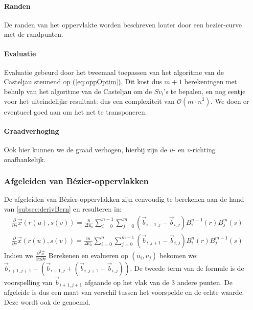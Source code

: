\documentclass[a4paper,titlepage]{article}
\newcommand{\termen}[1]{\index{#1}\textbf{\sffamily{#1}}}
\newcommand{\brak}[1]{\left(#1\right)}
\newcommand{\bigoh}[1]{\ensuremath{\mathcal{O}\left(#1\right)}}
\begin{document}
\paragraph{Randen}
De randen van het oppervlakte worden beschreven louter door een bezier-curve met de randpunten.
\paragraph{Evaluatie}
Evaluatie gebeurd door het tweemaal toepassen van het algoritme van de Casteljau steunend op (\ref{eq:oppOptim}). Dit kost dus $m+1$ berekeningen met behulp van het algoritme van de Casteljau om de $Sv_i$'s te bepalen, en nog eentje voor het uiteindelijke resultaat: dus een complexiteit van \bigoh{m\cdot n^2}. We doen er eventueel goed aan om het net te transponeren.
\paragraph{Graadverhoging}
Ook hier kunnen we de graad verhogen, hierbij zijn de $u$- en $v$-richting onafhankelijk.
\subsubsection{Afgeleiden van B\'ezier-oppervlakken}
De afgeleiden van B\'ezier-oppervlakken zijn eenvoudig te berekenen aan de hand van \ref{subsec:derivBern} en resulteren in:
\begin{equation}
\begin{array}{l}
\displaystyle\frac{\partial}{\partial u}\vec{x}\brak{r\brak{u},s\brak{v}}=\displaystyle\frac{n}{\Delta u_0}\displaystyle\sum_{i=0}^{n-1}{\displaystyle\sum_{j=0}^m\brak{\vec{b}_{i+1,j}-\vec{b}_{i,j}}B_i^{n-1}\brak{r}B_j^m\brak{s}}\\
\displaystyle\frac{\partial}{\partial v}\vec{x}\brak{r\brak{u},s\brak{v}}=\displaystyle\frac{m}{\Delta v_0}\displaystyle\sum_{i=0}^{n}{\displaystyle\sum_{j=0}^{m-1}\brak{\vec{b}_{i,j+1}-\vec{b}_{i,j}}B_i^n\brak{r}B_j^{m-1}\brak{s}}
\end{array}
\end{equation}
Indien we $\frac{\partial^2\vec{x}}{\partial u\partial v}$ Berekenen en evalueren op $\brak{u_{i},v_{j}}$ bekomen we: $\vec{b}_{i+1,j+1}-\brak{\vec{b}_{i+1,j}+\brak{\vec{b}_{i,j+1}-\vec{b}_{i,j}}}$. De tweede term van de formule is de voorspelling van $\vec{b}_{i+1,j+1}$ afgaande op het vlak van de 3 andere punten. De afgeleide is dus een maat van verschil tussen het voorspelde en de echte waarde. Deze wordt ook de \termen{draai-vector} genoemd.
\end{document}
